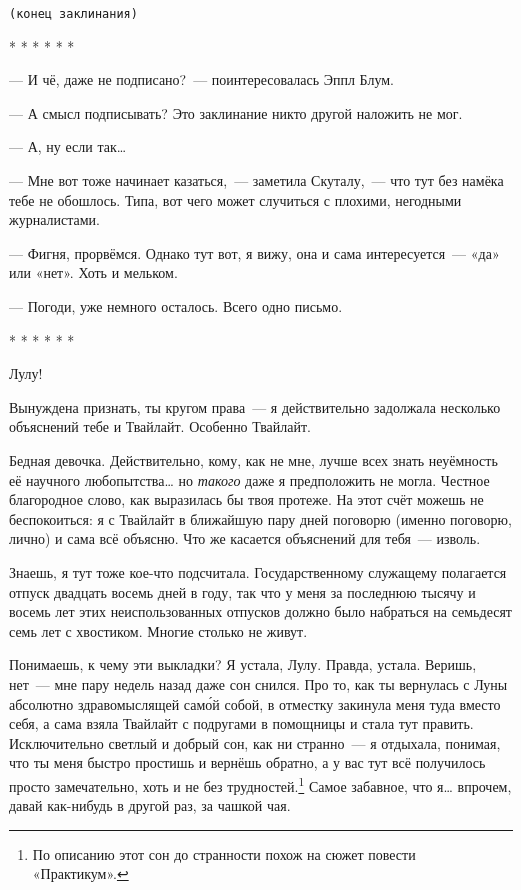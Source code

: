 \documentclass[fontsize=11pt,a5paper,titlepage=firstcover]{scrbook}
\begin{document}
\begin{center}\texttt{(конец заклинания)}\end{center}
\begin{center}* * * * * *\end{center}

--- И чё, даже не подписано?~--- поинтересовалась Эппл Блум.

--- А смысл подписывать? Это заклинание никто другой наложить не мог.

--- А, ну если так{\ldots}

--- Мне вот тоже начинает казаться,~--- заметила Скуталу,~--- что тут без намёка тебе не обошлось. Типа, вот чего может случиться с плохими, негодными журналистами.

--- Фигня, прорвёмся. Однако тут вот, я вижу, она и сама интересуется~--- «да» или «нет». Хоть и мельком.

--- Погоди, уже немного осталось. Всего одно письмо.
\vspace{2mm}
\begin{center}
	* * * * * *
\end{center}

Лулу!

Вынуждена признать, ты кругом права~--- я действительно задолжала несколько объяснений тебе и Твайлайт. Особенно Твайлайт.

Бедная девочка. Действительно, кому, как не мне, лучше всех знать неуёмность её научного любопытства{\ldots} но \emph{такого} даже я предположить не могла. Честное благородное слово, как выразилась бы твоя протеже. На этот счёт можешь не беспокоиться: я с Твайлайт в ближайшую пару дней поговорю (именно поговорю, лично) и сама всё объясню. Что же касается объяснений для тебя~--- изволь.

Знаешь, я тут тоже кое-что подсчитала. Государственному служащему полагается отпуск двадцать восемь дней в году, так что у меня за последнюю тысячу и восемь лет этих неиспользованных отпусков должно было набраться на семьдесят семь лет с хвостиком. Многие столько не живут.

Понимаешь, к чему эти выкладки? Я устала, Лулу. Правда, устала. Веришь, нет~--- мне пару недель назад даже сон снился. Про то, как ты вернулась с Луны абсолютно здравомыслящей само́й собой, в отместку закинула меня туда вместо себя, а сама взяла Твайлайт с подругами в помощницы и стала тут править. Исключительно светлый и добрый сон, как ни странно~--- я отдыхала, понимая, что ты меня быстро простишь и вернёшь обратно, а у вас тут всё получилось просто замечательно, хоть и не без трудностей.\footnote{По описанию этот сон до странности похож на сюжет повести «Практикум».} Самое забавное, что я{\ldots} впрочем, давай как-нибудь в другой раз, за чашкой чая.
\end{document}
